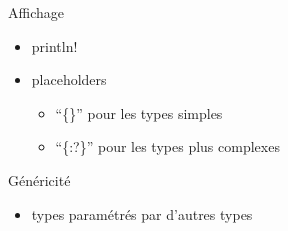 \begin{frame}[fragile]{Affichage}
\protect\hypertarget{affichage}{}
\begin{Shaded}
\begin{Highlighting}[]
\OperatorTok{\{}
    \OperatorTok{:}  \OperatorTok{=} \OperatorTok{;}
    \NormalTok{(}\OperatorTok{,}\OperatorTok{;}
\OperatorTok{\}}
\end{Highlighting}
\end{Shaded}

\begin{itemize}
\tightlist
\item
  println!
\item
  placeholders

  \begin{itemize}
  \tightlist
  \item
    ``\{\}'' pour les types simples
  \item
    ``\{:?\}'' pour les types plus complexes
  \end{itemize}
\end{itemize}
\end{frame}

\begin{frame}[fragile]{Généricité}
\protect\hypertarget{guxe9nuxe9ricituxe9}{}
\begin{Shaded}
\begin{Highlighting}[]
 \OperatorTok{:}\OperatorTok{\textless{}}\OperatorTok{\textgreater{}} \OperatorTok{=} \PreprocessorTok{::}\OperatorTok{;}
\NormalTok{)}\OperatorTok{;}
\NormalTok{)}\OperatorTok{;}
 \OperatorTok{:} \OperatorTok{\textless{}}\OperatorTok{\textgreater{}} \OperatorTok{=} \PreprocessorTok{::}\OperatorTok{;}
\NormalTok{)}\OperatorTok{;}

\OperatorTok{\textless{}}\OperatorTok{\textgreater{}}\OperatorTok{:} \OperatorTok{\textless{}}\OperatorTok{\textgreater{},}\OperatorTok{:}\OperatorTok{{-}\textgreater{}} \OperatorTok{\textless{}}\OperatorTok{\textgreater{};}
\end{Highlighting}
\end{Shaded}

\begin{itemize}
\tightlist
\item
  types paramétrés par d'autres types
\end{itemize}
\end{frame}

